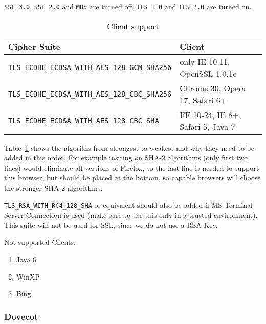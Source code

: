 \verb|SSL 3.0|, \verb|SSL 2.0| and \verb|MD5| are turned off.
\verb|TLS 1.0| and \verb|TLS 2.0| are turned on.

\begin{table}[h]
  \centering
  \small
  \begin{tabular}{|l|l|}
    \hline
    Cipher Suite & Client \\
    \hline
    \verb|TLS_ECDHE_ECDSA_WITH_AES_128_GCM_SHA256| & only IE 10,11, OpenSSL 1.0.1e \\
    \hline
    \verb|TLS_ECDHE_ECDSA_WITH_AES_128_CBC_SHA256| & Chrome 30, Opera 17, Safari 6+ \\
    \hline
    \verb|TLS_ECDHE_ECDSA_WITH_AES_128_CBC_SHA| & FF 10-24, IE 8+, Safari 5, Java 7\\
    \hline
  \end{tabular}
  \caption{Client support}
  \label{tab:MS_IIS_Client_Support}
\end{table}

Table~\ref{tab:MS_IIS_Client_Support} shows the algoriths from
strongest to weakest and why they need to be added in this order. For
example insiting on SHA-2 algorithms (only first two lines) would
eliminate all versions of Firefox, so the last line is needed to
support this browser, but should be placed at the bottom, so capable
browsers will choose the stronger SHA-2 algorithms.

\verb|TLS_RSA_WITH_RC4_128_SHA| or equivalent should also be added if
MS Terminal Server Connection is used (make sure to use this only in a
trusted environment). This suite will not be used for SSL, since we do
not use a RSA Key.




Not supported Clients:
\begin{enumerate}
\item Java 6
\item WinXP
\item Bing
\end{enumerate}



\subsubsection{Dovecot}


